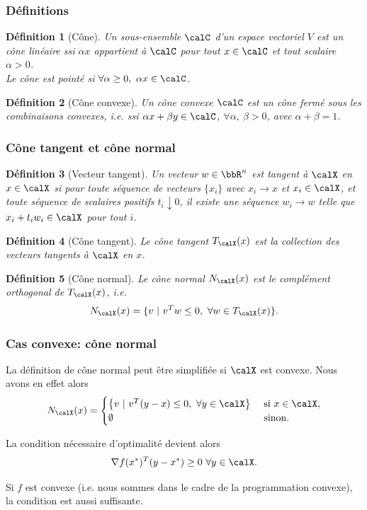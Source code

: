 \documentclass[t,aspectratio=169,usepdftitle=false]{beamer}
\newtheorem{defn}{Définition}
\def\red{\color{red}}
\def\cX{\calX}
\begin{document}
\begin{frame}
\frametitle{Définitions}

\begin{defn}[Cône]
Un sous-ensemble $\calC$ d'un espace vectoriel $V$ est un {\red cône} linéaire
ssi	$\alpha x$ appartient à $\calC$ pour tout $x \in \calC$ et tout scalaire $\alpha > 0$.\\
Le cône est pointé si $\forall \alpha \geq 0,\ \alpha x \in \calC$.
\end{defn}

\mbox{}
	
\begin{defn}[Cône convexe]
Un {\red cône convexe} $\calC$ est un cône fermé sous les combinaisons convexes, i.e. ssi $\alpha x + \beta y \in \calC$, $\forall \alpha,\ \beta > 0$, avec $\alpha + \beta = 1$.
\end{defn}

\end{frame}

\begin{frame}
\frametitle{Cône tangent et cône normal}

\begin{defn}[Vecteur tangent]
Un vecteur $w \in \bbR^n$ est tangent à $\cX$ en $x \in \cX$ si pour toute séquence de vecteurs $\lbrace x_i \rbrace$ avec $x_i \rightarrow x$ et $x_i \in \cX$, et toute séquence de scalaires positifs $t_i \downarrow 0$, il existe une séquence $w_i \rightarrow w$ telle que $x_i + t_iw_i \in \cX$ pour tout $i$.
\end{defn}	
	
\begin{defn}[Cône tangent]
Le {\red cône tangent $T_{\cX}(x)$} est la collection des vecteurs tangents à $\cX$ en $x$.
\end{defn}	

\begin{defn}[Cône normal]
Le {\red cône normal $N_{\cX}(x)$} est le complément orthogonal de $T_{\cX}(x)$, i.e.
\[
N_{\cX}(x) = \lbrace v\ |\ v^Tw \leq 0,\ \forall w \in T_{\cX}(x) \rbrace.
\]
\end{defn}	
	
\end{frame}

\begin{frame}
\frametitle{Cas convexe: cône normal}

La définition de cône normal peut être simplifiée si $\cX$ est convexe.
Nous avons en effet alors
$$
N_{\cX}(x) =
\begin{cases}
\left\lbrace v\ |\ v^T(y-x) \leq 0,\ \forall y \in \cX \right\rbrace & \text{\ si\ } x \in \cX,\\
\emptyset & \text{\ sinon.}
\end{cases}
$$
	
\mbox{}

La condition nécessaire d'optimalité devient alors
$$	
\nabla f(x^*)^T (y-x^*) \geq 0\ \forall y \in \cX.
$$
	
	
Si $f$ est convexe (i.e. nous sommes dans le cadre de la programmation convexe), la condition est aussi suffisante.

\end{frame}
\end{document}
